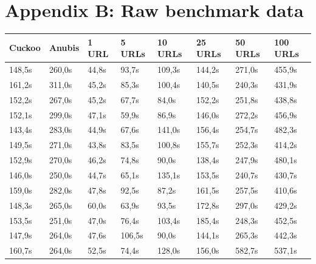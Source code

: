 \documentclass{scrartcl}
\begin{document}
\clearpage

\section*{Appendix B: Raw benchmark data}


\begin{table}[h]
\begin{tabular}{@{}llllllll@{}}
\toprule
Cuckoo  & Anubis  & 1 URL       & 5 URLs      & 10 URLs      & 25 URLs      & 50 URLs      & 100 URLs     \\ \midrule
148,5s  & 260,0s  & 44,8s       & 93,7s       & 109,3s       & 144,2s       & 271,0s       & 455,9s        \\
161,2s  & 311,0s  & 45,2s       & 85,3s       & 100,4s       & 140,5s       & 240,3s       & 431,9s        \\
152,2s  & 267,0s  & 45,2s       & 67,7s       & 84,0s        & 152,2s       & 251,8s       & 438,8s        \\
152,1s  & 299,0s  & 47,1s       & 59,9s       & 86,9s        & 146,0s       & 272,2s       & 456,9s        \\
143,4s  & 283,0s  & 44,9s       & 67,6s       & 141,0s       & 156,4s       & 254,7s       & 482,3s        \\
149,5s  & 271,0s  & 43,8s       & 83,5s       & 100,8s       & 155,7s       & 252,3s       & 414,2s        \\
152,9s  & 270,0s  & 46,2s       & 74,8s       & 90,0s        & 138,4s       & 247,9s       & 480,1s        \\
146,0s  & 250,0s  & 44,7s       & 65,1s       & 135,1s       & 153,5s       & 240,7s       & 430,7s        \\
159,0s  & 282,0s  & 47,8s       & 92,5s       & 87,2s        & 161,5s       & 257,5s       & 410,6s        \\
148,3s  & 265,0s  & 60,0s       & 63,9s       & 93,5s        & 172,8s       & 297,0s       & 429,2s        \\
153,5s  & 251,0s  & 47,0s       & 76,4s       & 103,4s       & 185,4s       & 248,3s       & 452,5s        \\
147,9s  & 264,0s  & 47,6s       & 106,5s      & 90,0s        & 144,1s       & 265,3s       & 442,3s        \\
160,7s  & 264,0s  & 52,5s       & 74,4s       & 128,0s       & 156,0s       & 582,7s       & 537,1s        \\

\end{tabular}
\end{table}
\end{document}
